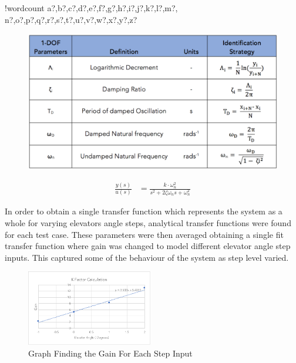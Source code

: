 \documentclass[11pt]{article}
\newcounter{words}
\newenvironment{counted}{%
  \setcounter{words}{0}
  \SearchList!{wordcount}{\stepcounter{words}}
    {a?,b?,c?,d?,e?,f?,g?,h?,i?,j?,k?,l?,m?,
    n?,o?,p?,q?,r?,s?,t?,u?,v?,w?,x?,y?,z?}
  \UndoBoundary{'}
  \SearchOrder{p;}}{%
  \StopSearching}
\begin{document}
\begin{counted}
\begin{figure}
\vspace{-25pt}
  \centering
  \includegraphics[trim = 0 0 0 0, clip, width=\linewidth]{eqtable.png}
  \label{eqtable}
\end{figure}

\begin{align}
\frac{ y(s) }{ u(s) } &=\frac{ k\cdot \omega_{ n }^{ 2 } }{ s^{ 2 }+2\zeta \omega_{ n }s+\omega_{ n }^{ 2 } } \label{2otf}
\end{align}

In order to obtain a single transfer function which represents the
system as a whole for varying elevators angle steps, analytical transfer
functions were found for each test case. These parameters were then
averaged obtaining a single fit transfer function where gain was changed
to model different elevator angle step inputs. This captured some of the
behaviour of the system as step level varied.

\begin{figure}
  \begin{center}
\vspace{-25pt}
\includegraphics[trim = 10 10 10 10, clip, width=0.49\textwidth]{kgraph.pdf}  
\end{center}
\caption{Graph Finding the Gain For Each Step Input}
\label{kgraph}
  \vspace{-15pt}
\end{figure}


\end{counted}
\end{document}
